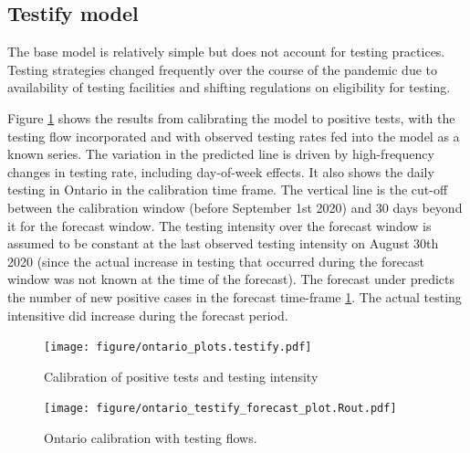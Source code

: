 \documentclass[12pt]{article}\usepackage[]{graphicx}\usepackage[]{color}
\begin{document}
\FloatBarrier

\subsection{Testify model}

The base model is relatively simple but does not account for testing practices. Testing strategies changed frequently over the course of the pandemic due to availability of testing facilities and shifting regulations on eligibility for testing.

Figure \ref{fig:Ont_calibration_testify} shows the results from calibrating the model to positive tests, with the testing flow incorporated and with observed testing rates fed into the model as a known series.
The variation in the predicted line is driven by high-frequency changes in testing rate, including day-of-week effects.
It also shows the daily testing in Ontario in the calibration time frame. The vertical line is the cut-off between the calibration window (before September 1st 2020) and 30 days beyond it for the forecast window. The testing intensity over the forecast window is assumed to be constant at the last observed testing intensity on August 30th 2020 (since the actual increase in testing that occurred during the forecast window was not known at the time of the forecast). The forecast under predicts the number of new positive cases in the forecast time-frame \ref{fig:Ont_calibration_testify}. The actual testing intensitive did increase during the forecast period. 


\begin{figure}[ht!]
\texttt{[image: figure/ontario\_plots.testify.pdf]}

\caption{Calibration of positive tests and testing intensity}
\label{fig:Ont_calibration_testify}
\end{figure}

\begin{figure}[ht!]
\texttt{[image: figure/ontario\_testify\_forecast\_plot.Rout.pdf]}

\caption{Ontario calibration with testing flows. }
\label{fig:Ont_calibration_testify_forecast}
\end{figure}

\end{document}
